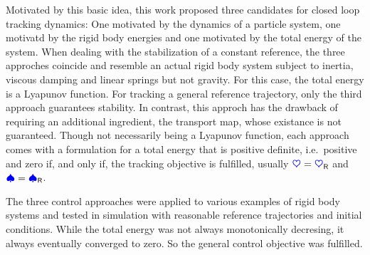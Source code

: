Motivated by this basic idea, this work proposed three candidates for closed loop tracking dynamics:
One motivated by the dynamics of a particle system, one motivatd by the rigid body energies and one motivated by the total energy of the system.
When dealing with the stabilization of a constant reference, the three approches coincide and resemble an actual rigid body system subject to inertia, viscous damping and linear springs but not gravity.
For this case, the total energy is a Lyapunov function.
For tracking a general reference trajectory, only the third approach guarantees stability.
In contrast, this approch has the drawback of requiring an additional ingredient, the transport map, whose existance is not guaranteed.
Though not necessarily being a Lyapunov function, each approach comes with a formulation for a total energy that is positive definite, i.e.\ positive and zero if, and only if, the tracking objective is fulfilled, usually $\boldsymbol{\textcolor{blue}{\heartsuit}}=\boldsymbol{\textcolor{blue}{\heartsuit}}_{\mathsf{R}}$ and $\boldsymbol{\textcolor{blue}{\spadesuit}} = \boldsymbol{\textcolor{blue}{\spadesuit}}_{\mathsf{R}}$.

The three control approaches were applied to various examples of rigid body systems and tested in simulation with reasonable reference trajectories and initial conditions.
While the total energy was not always monotonically decresing, it always eventually converged to zero.
So the general control objective was fulfilled.



